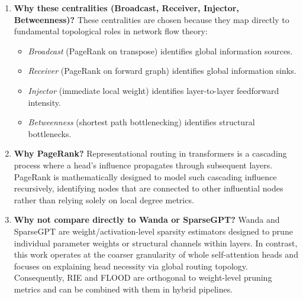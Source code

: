 \documentclass[11pt,a4paper]{article}
\theoremstyle{definition}
\theoremstyle{plain}
\begin{document}
\begin{enumerate}[leftmargin=*]
    \item \textbf{Why these centralities (Broadcast, Receiver, Injector, Betweenness)?}
    These centralities are chosen because they map directly to fundamental topological roles in network flow theory:
    \begin{itemize}
        \item \emph{Broadcast} (PageRank on transpose) identifies global information sources.
        \item \emph{Receiver} (PageRank on forward graph) identifies global information sinks.
        \item \emph{Injector} (immediate local weight) identifies layer-to-layer feedforward intensity.
        \item \emph{Betweenness} (shortest path bottlenecking) identifies structural bottlenecks.
    \end{itemize}
    
    \item \textbf{Why PageRank?}
    Representational routing in transformers is a cascading process where a head's influence propagates through subsequent layers. PageRank is mathematically designed to model such cascading influence recursively, identifying nodes that are connected to other influential nodes rather than relying solely on local degree metrics.
    
    \item \textbf{Why not compare directly to Wanda or SparseGPT?}
    Wanda and SparseGPT are weight/activation-level sparsity estimators designed to prune individual parameter weights or structural channels within layers. In contrast, this work operates at the coarser granularity of whole self-attention heads and focuses on explaining head necessity via global routing topology. Consequently, RIE and FLOOD are orthogonal to weight-level pruning metrics and can be combined with them in hybrid pipelines.
\end{enumerate}



\end{document}
